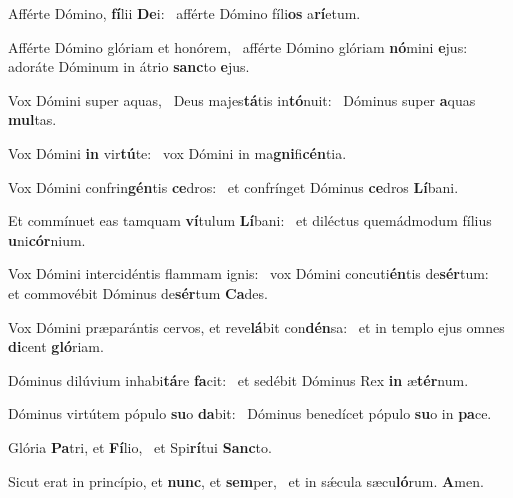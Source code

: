 \item Afférte Dómino, \textbf{fí}lii \textbf{De}i:~\psstar{} afférte Dómino fíli\textbf{os} a\textbf{rí}etum.
\item Afférte Dómino glóriam et honórem,~\pscross{} afférte Dómino glóriam \textbf{nó}mini \textbf{e}jus:~\psstar{} adoráte Dóminum in átrio \textbf{sanc}to \textbf{e}jus.
\item Vox Dómini super aquas,~\pscross{} Deus majes\textbf{tá}tis in\textbf{tó}nuit:~\psstar{} Dóminus super \textbf{a}quas \textbf{mul}tas.
\item Vox Dómini \textbf{in} vir\textbf{tú}te:~\psstar{} vox Dómini in ma\textbf{gni}fi\textbf{cén}tia.
\item Vox Dómini confrin\textbf{gén}tis \textbf{ce}dros:~\psstar{} et confrínget Dóminus \textbf{ce}dros \textbf{Lí}bani.
\item Et commínuet eas tamquam \textbf{ví}tulum \textbf{Lí}bani:~\psstar{} et diléctus quemádmodum fílius \textbf{u}ni\textbf{cór}nium.
\item Vox Dómini intercidéntis flammam ignis:~\pscross{} vox Dómini concuti\textbf{én}tis de\textbf{sér}tum:~\psstar{} et commovébit Dóminus de\textbf{sér}tum \textbf{Ca}des.
\item Vox Dómini præparántis cervos, et reve\textbf{lá}bit con\textbf{dén}sa:~\psstar{} et in templo ejus omnes \textbf{di}cent \textbf{gló}riam.
\item Dóminus dilúvium inhabi\textbf{tá}re \textbf{fa}cit:~\psstar{} et sedébit Dóminus Rex \textbf{in} æ\textbf{tér}num.
\item Dóminus virtútem pópulo \textbf{su}o \textbf{da}bit:~\psstar{} Dóminus benedícet pópulo \textbf{su}o in \textbf{pa}ce.
\item Glória \textbf{Pa}tri, et \textbf{Fí}lio,~\psstar{} et Spi\textbf{rí}tui \textbf{Sanc}to.
\item Sicut erat in princípio, et \textbf{nunc}, et \textbf{sem}per,~\psstar{} et in sǽcula sæcu\textbf{ló}rum. \textbf{A}men.
